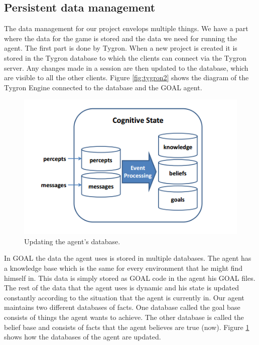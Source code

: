 \newpage
\subsection{Persistent data management}
The data management for our project envelops multiple things. We have a part where the data for the game is stored and the data we need for running the agent. The first part is done by Tygron. When a new project is created it is stored in the Tygron database to which the clients can connect via the Tygron server. Any changes made in a session are then updated to the database, which are visible to all the other clients. Figure \ref{fig:tygron2} shows the diagram of the Tygron Engine connected to the database and the GOAL agent.

\begin{figure}[h!]
  \includegraphics[width=\linewidth]{agentstate.png}
  \caption{Updating the agent's database.}
  \label{fig:agentstate1}
\end{figure}
In GOAL the data the agent uses is stored in multiple databases. The agent has a knowledge base which is the same for every environment that he might find himself in. This data is simply stored as GOAL code in the agent his GOAL files. The rest of the data that the agent uses is dynamic and his state is updated constantly according to the situation that the agent is currently in. Our agent maintains two different databases of facts. One database called the goal base consists of things the agent wants to achieve. The other database is called the belief base and consists of facts that the agent believes are true (now).  Figure \ref{fig:agentstate1} \cite{goal} shows how the databases of the agent are updated.



